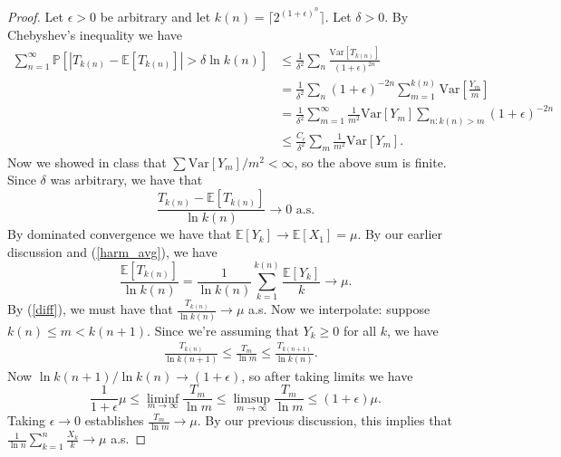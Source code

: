 \documentclass[11pt,letterpaper]{report}
\newcommand{\E}{\mathbb{E}}
\newcommand{\Prob}{\mathbb{P}}
\newcommand{\Var}{\text{Var}}
\begin{document}
\begin{proof}
	\noindent Let $\epsilon>0$ be arbitrary and let $k(n) = \lceil 2^{(1+\epsilon)^n}\rceil$. Let $\delta>0$. By Chebyshev's inequality we have
	\begin{align*}
		\sum_{n = 1}^\infty \Prob[|T_{k(n)} - \E[T_{k(n)}]| > \delta \ln k(n)] &\leq \frac{1}{\delta^2}\sum_n \frac{\Var[T_{k(n)}]}{(1+\epsilon)^{2n}}\\
		&= \frac{1}{\delta^2}\sum_n (1+\epsilon)^{-2n}\sum_{m = 1}^{k(n)}\Var\left[\frac{Y_m}{m}\right]\\
		&= \frac{1}{\delta^2}\sum_{m=1}^\infty \frac{1}{m^2}\Var[Y_m]\sum_{n: k(n)>m}(1+\epsilon)^{-2n}\\
		&\leq \frac{C_\epsilon}{\delta^2}\sum_m\frac{1}{m^2}\Var[Y_m].
	\end{align*}
	Now we showed in class that $\sum \Var[Y_m]/m^2<\infty$, so the above sum is finite. Since $\delta$ was arbitrary, we have that
	\begin{equation}\label{diff}
	\frac{T_{k(n)} - \E[T_{k(n)}]}{\ln k(n)}\to 0\text{ a.s.}
	\end{equation}
	By dominated convergence we have that $\E[Y_k] \to \E[X_1] = \mu$. By our earlier discussion and (\ref{harm_avg}), we have
	\[
	\frac{\E[T_{k(n)}]}{\ln k(n)} = \frac{1}{\ln k(n)}\sum_{k = 1}^{k(n)}\frac{\E[Y_k]}{k} \to \mu.
	\]
	By (\ref{diff}), we must have that $\frac{T_{k(n)}}{\ln k(n)}\to \mu$ a.s. Now we interpolate: suppose $k(n)\leq m< k(n+1)$. Since we're assuming that $Y_k\geq 0$ for all $k$, we have
	\begin{align}
	&\frac{T_{k(n)}}{\ln k(n+1)} \leq \frac{T_m}{\ln m}\leq \frac{T_{k(n+1)}}{\ln k(n)}.
	\end{align}
	Now $\ln k(n+1)/ \ln k(n) \to (1+\epsilon)$, so after taking limits we have
	\[
	\frac{1}{1+\epsilon}\mu \leq \liminf_{m\to \infty}\frac{T_m}{\ln m}\leq \limsup_{m\to \infty}\frac{T_m}{\ln m}\leq (1+\epsilon)\mu.
	\]
	Taking $\epsilon\to 0$ establishes $\frac{T_m}{\ln m}\to \mu$. By our previous discussion, this implies that $\frac{1}{\ln n}\sum_{k=1}^n\frac{X_k}{k}\to \mu$ a.s.
\end{proof}
\end{document}
